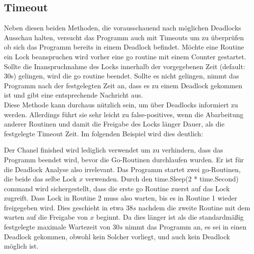 \subsection{Timeout}
Neben diesen beiden Methoden, die vorausschauend nach möglichen Deadlocks 
Ausschau halten, versucht das Programm auch mit Timeouts um zu überprüfen ob 
sich das Programm bereits in einem Deadlock befindet. Möchte eine Routine ein 
Lock beanspruchen wird vorher eine go routine mit einem Counter gestartet.
Sollte die Inanspruchnahme des Locks innerhalb der vorgegebenen Zeit 
(default: 30s) gelingen, wird die go routine beendet. Sollte es nicht gelingen,
nimmt das Programm nach der festgelegten Zeit an, dass es zu einem Deadlock 
gekommen ist und gibt eine entsprechende Nachricht aus.\\
Diese Methode kann
durchaus nützlich sein, um über Deadlocks informiert zu werden. Allerdings führt
sie sehr leicht zu false-positives, wenn die Abarbeitung anderer Routinen und 
damit die Freigabe des Locks länger Dauer, als die festgelegte Timeout Zeit.
Im folgenden Beispiel wird dies deutlich:
\begin{figure}[H]
    
\end{figure}
Der Chanel finished wird lediglich verwendet um zu verhindern, dass das Programm 
beendet wird, bevor die Go-Routinen durchlaufen wurden. Er ist für die Deadlock
Analyse also irrelevant. Das Programm startet zwei go-Routinen, die beide das 
selbe Lock $x$ verwenden. Durch den time.Sleep(2 * time.Second) command wird 
sichergestellt, dass die erste go Routine zuerst auf das Lock zugreift. 
Dass Lock in Routine 2 muss also warten, bis es in Routine 1 wieder freigegeben
wird. Dies geschieht in etwa $38 s$ nachdem die zweite Routine mit dem warten 
auf die Freigabe von $x$ beginnt. Da dies länger ist als die standardmäßig
festgelegte maximale Wartezeit von $30 s$ nimmt das Programm an, es sei in einen 
Deadlock gekommen, obwohl kein Solcher vorliegt, und auch kein Deadlock möglich 
ist.

